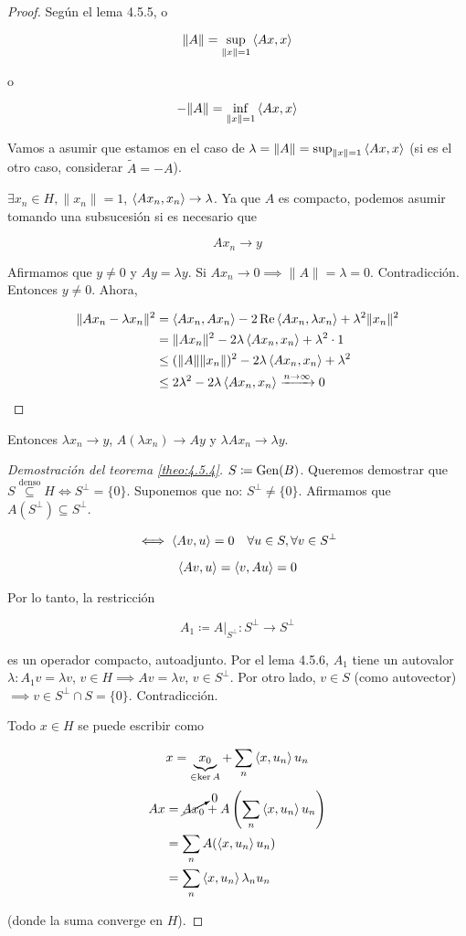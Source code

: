 \begin{proof}
   Según el lema 4.5.5, o

   \[\|A\|=\sup_{\|x\|=1}\left\langle Ax,x\right\rangle\]

   o 

   \[-\|A\|=\inf_{\|x\|=1}\left\langle Ax, x\right\rangle\]

   Vamos a asumir que estamos en el caso de $\lambda=\|A\|=\sup_{\|x\|=1}\left\langle Ax,x\right\rangle$ (si es el otro caso, considerar $\tilde A=-A$).

   $\exists x_n\in H,\|x_n\|=1$, $\left\langle Ax_n,x_n\right\rangle\to\lambda$. Ya que $A$ es compacto, podemos asumir tomando una subsucesión si es necesario que 

   \[Ax_n\to y\]

   Afirmamos que $y\neq 0$ y $Ay=\lambda y$. Si $Ax_n\to 0\implies \|A\|=\lambda=0$. Contradicción. Entonces $y\neq 0$. Ahora,

   \begin{align*}
      \|Ax_n-\lambda x_n\|^2&=\left\langle Ax_n,Ax_n\right\rangle-2\operatorname{Re} \left\langle Ax_n,\lambda x_n\right\rangle+\lambda^2\|x_n\|^2\\
      &=\|Ax_n\|^2-2\lambda\left\langle Ax_n,x_n\right\rangle+\lambda^2\cdot 1\\
      &\leq (\|A\|\|x_n\|)^2-2\lambda \left\langle Ax_n,x_n\right\rangle+\lambda^2\\
      &\leq 2\lambda^2-2\lambda\left\langle Ax_n,x_n\right\rangle\xrightarrow{n\to\infty} 0
   \end{align*}
\end{proof}

Entonces $\lambda x_n\to y$, $A(\lambda x_n)\to Ay$ y $\lambda Ax_n\to\lambda y$.

\begin{proof}[Demostración del teorema \ref{theo:4.5.4}]
   $S\coloneqq \operatorname{Gen}(B)$. Queremos demostrar que $S\overset{\text{denso}}{\subseteq} H\iff S^\perp =\{0\}$. Suponemos que no: $S^\perp \neq \{0\}$. Afirmamos que $A(S^\perp)\subseteq S^\perp$.

   \[\iff \left\langle Av,u\right\rangle=0\quad\forall u\in S,\forall v\in S^\perp\]

   \[\left\langle Av, u\right\rangle=\left\langle v, Au\right\rangle=0\]

   Por lo tanto, la restricción 

   \[A_1\coloneqq A\big\rvert_{S^\perp}:S^\perp\to S^\perp\]

   es un operador compacto, autoadjunto. Por el lema 4.5.6, $A_1$ tiene un autovalor $\lambda:A_1 v=\lambda v$, $v\in H\implies Av=\lambda v$, $v\in S^\perp$. Por otro lado, $v\in S$ (como autovector) $\implies v\in S^\perp\cap S=\{0\}$. Contradicción.

   Todo $x\in H$ se puede escribir como 

   \[x=\underbrace{x_0}_{\in \ker A}+\sum_{n} \left\langle x,u_n\right\rangle u_n\]
   \begin{align*}
      Ax&= \cancelto{0}{Ax_0}+A\left(\sum_{n}\left\langle x,u_n\right\rangle u_n\right)\\
      &=\sum_{n}A(\left\langle x,u_n\right\rangle u_n)\\
      &=\sum_{n}\left\langle x,u_n\right\rangle\lambda_n u_n
   \end{align*}

   (donde la suma converge en $H$).
\end{proof}
